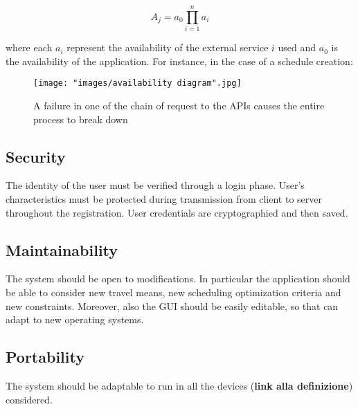\begin{equation}
A_j = a_0 \prod_{i=1}^n a_i 
\end{equation} 

where each $a_i$ represent the availability of the external service $i$ used and $a_0$ is the availability of the application. For instance, in the case of a schedule creation:

\begin{figure}[H]
\begin{center}
\texttt{[image: "images/availability diagram".jpg]}
\caption{A failure in one of the chain of request to the APIs causes the entire process to break down}
\end{center}
\end{figure}

\subsection{Security}
The identity of the user must be verified through a login phase.
User's characteristics must be protected during transmission from client to server throughout the registration. User credentials are cryptographied and then saved.
\subsection{Maintainability}
The system should be open to modifications.
In particular the application should be able to consider new travel means, new scheduling optimization criteria and new constraints.
Moreover, also the GUI should be easily editable, so that can adapt to new operating systems.

\subsection{Portability}
The system should be adaptable to run in all the devices (\textbf{link alla definizione}) considered.
